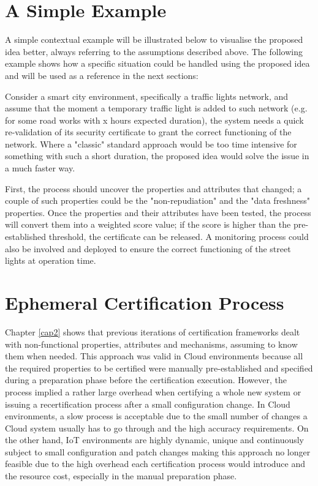 \section{A Simple Example}
A simple contextual example will be illustrated below to visualise the proposed idea better, always referring to the assumptions described above. The following example shows how a specific situation could be handled using the proposed idea and will be used as a reference in the next sections:

Consider a smart city environment, specifically a traffic lights network, and assume that the moment a temporary traffic light is added to such network (e.g. for some road works with x hours expected duration), the system needs a quick re-validation of its security certificate to grant the correct functioning of the network. Where a "classic" standard approach would be too time intensive for something with such a short duration, the proposed idea would solve the issue in a much faster way. 

First, the process should uncover the properties and attributes that changed; a couple of such properties could be the "non-repudiation" and the "data freshness" properties. Once the properties and their attributes have been tested, the process will convert them into a weighted score value; if the score is higher than the pre-established threshold, the certificate can be released. A monitoring process could also be involved and deployed to ensure the correct functioning of the street lights at operation time.


\section{Ephemeral Certification Process}
Chapter \ref{cap2} shows that previous iterations of certification frameworks dealt with non-functional properties, attributes and mechanisms, assuming to know them when needed. This approach was valid in Cloud environments because all the required properties to be certified were manually pre-established and specified during a preparation phase before the certification execution. However, the process implied a rather large overhead when certifying a whole new system or issuing a recertification process after a small configuration change. In Cloud environments, a slow process is acceptable due to the small number of changes a Cloud system usually has to go through and the high accuracy requirements. On the other hand, IoT environments are highly dynamic, unique and continuously subject to small configuration and patch changes making this approach no longer feasible due to the high overhead each certification process would introduce and the resource cost, especially in the manual preparation phase.

